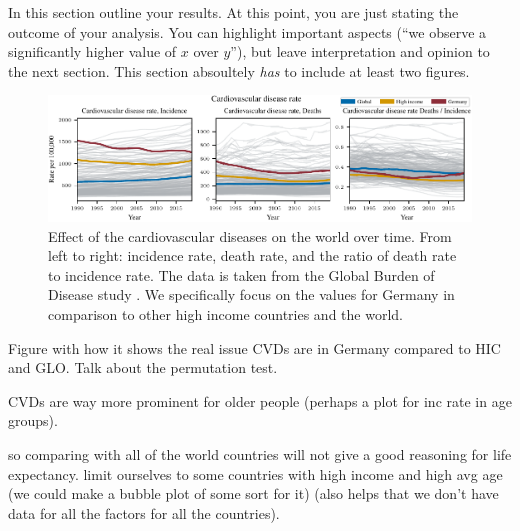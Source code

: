 In this section outline your results. At this point, you are just stating the outcome of your analysis. You can highlight important aspects (``we observe a significantly higher value of $x$ over $y$''), but leave interpretation and opinion to the next section. This section absoultely \emph{has} to include at least two figures.


\begin{figure}[h]
    \vskip 0.2in
    \centering
    \centerline{\includegraphics[]{fig/fig_cardiovascular_disease_mortality_rate.pdf}}
    \caption{Effect of the cardiovascular diseases on the world over time. From left to right: incidence rate, death rate, 
    and the ratio of death rate to incidence rate. The data is taken from the Global Burden of Disease study \citep{GBD2019}. We specifically focus on the values 
    for Germany in comparison to other high income countries and the world.}
    \label{Cardiovascular diseases over time}
\end{figure}


Figure \citep{GBD2019} with how it shows the real issue CVDs are in Germany compared to HIC and GLO. Talk about the permutation test. 

CVDs are way more prominent for older people (perhaps a plot for inc rate in age groups). 

so comparing with all of the world countries will not give a good reasoning for life expectancy. limit ourselves to some countries with high income and high avg age (we could make a bubble plot of some sort for it) (also helps that we don't have data for all the factors for all the countries).

